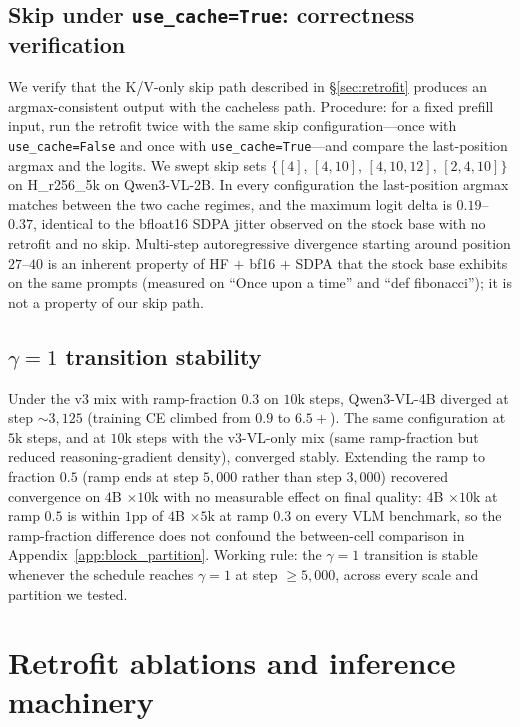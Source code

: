 \documentclass{article}
\begin{document}
\subsection{Skip under \texttt{use\_cache=True}: correctness verification}
\label{app:kv_equiv}
We verify that the K/V-only skip path described in \S\ref{sec:retrofit} produces an argmax-consistent output with the cacheless path. Procedure: for a fixed prefill input, run the retrofit twice with the same skip configuration---once with \texttt{use\_cache=False} and once with \texttt{use\_cache=True}---and compare the last-position argmax and the logits. We swept skip sets $\{[4]$, $[4,10]$, $[4,10,12]$, $[2,4,10]\}$ on H\_r256\_5k on Qwen3-VL-2B. In every configuration the last-position argmax matches between the two cache regimes, and the maximum logit delta is $0.19$--$0.37$, identical to the bfloat16 SDPA jitter observed on the stock base with no retrofit and no skip. Multi-step autoregressive divergence starting around position $27$--$40$ is an inherent property of HF $+$ bf16 $+$ SDPA that the stock base exhibits on the same prompts (measured on ``Once upon a time'' and ``def fibonacci''); it is not a property of our skip path.

\subsection{$\gamma{=}1$ transition stability}
\label{app:gamma_stability}
Under the v3 mix with ramp-fraction $0.3$ on $10$k steps, Qwen3-VL-4B diverged at step $\sim\!3{,}125$ (training CE climbed from $0.9$ to $6.5+$). The same configuration at $5$k steps, and at $10$k steps with the v3-VL-only mix (same ramp-fraction but reduced reasoning-gradient density), converged stably. Extending the ramp to fraction $0.5$ (ramp ends at step $5{,}000$ rather than step $3{,}000$) recovered convergence on $4$B $\times 10$k with no measurable effect on final quality: $4$B $\times 10$k at ramp $0.5$ is within $1$pp of $4$B $\times 5$k at ramp $0.3$ on every VLM benchmark, so the ramp-fraction difference does not confound the between-cell comparison in Appendix~\ref{app:block_partition}. Working rule: the $\gamma{=}1$ transition is stable whenever the schedule reaches $\gamma{=}1$ at step $\geq 5{,}000$, across every scale and partition we tested.

\section{Retrofit ablations and inference machinery}
\label{app:ablations}
\end{document}
